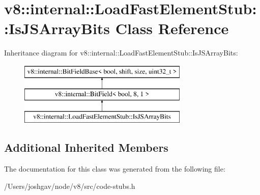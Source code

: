 \hypertarget{classv8_1_1internal_1_1_load_fast_element_stub_1_1_is_j_s_array_bits}{}\section{v8\+:\+:internal\+:\+:Load\+Fast\+Element\+Stub\+:\+:Is\+J\+S\+Array\+Bits Class Reference}
\label{classv8_1_1internal_1_1_load_fast_element_stub_1_1_is_j_s_array_bits}
Inheritance diagram for v8\+:\+:internal\+:\+:Load\+Fast\+Element\+Stub\+:\+:Is\+J\+S\+Array\+Bits\+:\begin{figure}[H]
\begin{center}
\leavevmode
\includegraphics[height=3.000000cm]{classv8_1_1internal_1_1_load_fast_element_stub_1_1_is_j_s_array_bits}
\end{center}
\end{figure}
\subsection*{Additional Inherited Members}


The documentation for this class was generated from the following file\+:\begin{DoxyCompactItemize}
\item 
/\+Users/joshgav/node/v8/src/code-\/stubs.\+h\end{DoxyCompactItemize}
